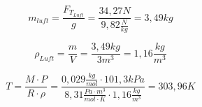 \begin{equation*}
	m_{luft} = \frac{F_{T_{Luft}}}{g} = \frac{34,27N}{9,82\frac{N}{kg}} = 3,49kg
\end{equation*}

\begin{equation*}
	\rho_{Luft} = \frac{m}{V} = \frac{3,49kg}{3m^{3}} = 1,16\frac{kg}{m^{3}}
\end{equation*}

\begin{equation*}
	T = \frac{M \cdot P}{R \cdot \rho} = \frac{0,029\frac{kg}{mol} \cdot 101,3kPa}{8,31\frac{Pa \cdot m^{3}}{mol \cdot K} \cdot 1,16 \frac{kg}{m^{3}}} = 303,96K
\end{equation*}